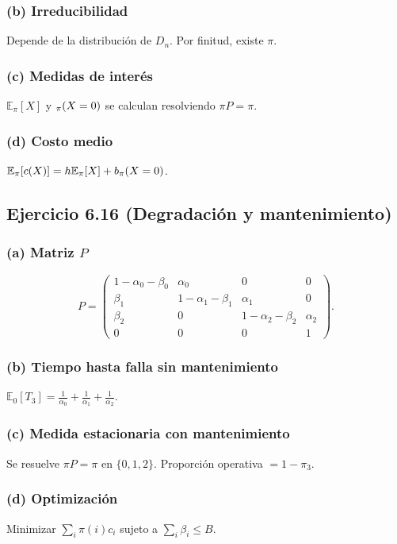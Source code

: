 \documentclass[12pt]{article}
\let\P\relax
\newcommand{\P}{\mathbb{P}}
\newcommand{\E}{\mathbb{E}}
\newcommand{\1}{\mathbf{1}}
\begin{document}
\subsubsection*{(b) Irreducibilidad}
Depende de la distribuci\'on de $D_n$. Por finitud, existe $\pi$.

\subsubsection*{(c) Medidas de inter\'es}
$\E_\pi[X]$ y $\P_\pi(X=0)$ se calculan resolviendo $\pi P=\pi$.

\subsubsection*{(d) Costo medio}
$\E_\pi[c(X)]=h\E_\pi[X]+b\P_\pi(X=0)$.

\subsection{Ejercicio 6.16 (Degradaci\'on y mantenimiento)}

\subsubsection*{(a) Matriz $P$}
\[
P=\begin{pmatrix}
1-\alpha_0-\beta_0 & \alpha_0 & 0 & 0\\
\beta_1 & 1-\alpha_1-\beta_1 & \alpha_1 & 0\\
\beta_2 & 0 & 1-\alpha_2-\beta_2 & \alpha_2\\
0 & 0 & 0 & 1
\end{pmatrix}.
\]

\subsubsection*{(b) Tiempo hasta falla sin mantenimiento}
$\E_0[T_3]=\frac1{\alpha_0}+\frac1{\alpha_1}+\frac1{\alpha_2}$.

\subsubsection*{(c) Medida estacionaria con mantenimiento}
Se resuelve $\pi P=\pi$ en $\{0,1,2\}$. Proporci\'on operativa $=1-\pi_3$.

\subsubsection*{(d) Optimizaci\'on}
Minimizar $\sum_i\pi(i)c_i$ sujeto a $\sum_i\beta_i\le B$.
\end{document}
